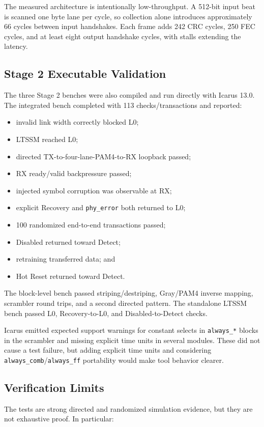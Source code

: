 \documentclass[11pt,a4paper]{article}
\newcommand{\code}[1]{\texttt{#1}}
\begin{document}
The measured architecture is intentionally low-throughput. A 512-bit input beat is scanned
one byte lane per cycle, so collection alone introduces approximately 66 cycles between
input handshakes. Each frame adds 242 CRC cycles, 250 FEC cycles, and at least eight output
handshake cycles, with stalls extending the latency.

\subsection{Stage 2 Executable Validation}
The three Stage 2 benches were also compiled and run directly with Icarus 13.0. The
integrated bench completed with 113 checks/transactions and reported:

\begin{itemize}[leftmargin=*]
    \item invalid link width correctly blocked L0;
    \item LTSSM reached L0;
    \item directed TX-to-four-lane-PAM4-to-RX loopback passed;
    \item RX ready/valid backpressure passed;
    \item injected symbol corruption was observable at RX;
    \item explicit Recovery and \code{phy\_error} both returned to L0;
    \item 100 randomized end-to-end transactions passed;
    \item Disabled returned toward Detect;
    \item retraining transferred data; and
    \item Hot Reset returned toward Detect.
\end{itemize}

The block-level bench passed striping/destriping, Gray/PAM4 inverse mapping, scrambler round
trips, and a second directed pattern. The standalone LTSSM bench passed L0,
Recovery-to-L0, and Disabled-to-Detect checks.

Icarus emitted expected support warnings for constant selects in \code{always\_*} blocks in
the scrambler and missing explicit time units in several modules. These did not cause a test
failure, but adding explicit time units and considering \code{always\_comb}/\code{always\_ff}
portability would make tool behavior clearer.

\subsection{Verification Limits}
The tests are strong directed and randomized simulation evidence, but they are not
exhaustive proof. In particular:
\end{document}
